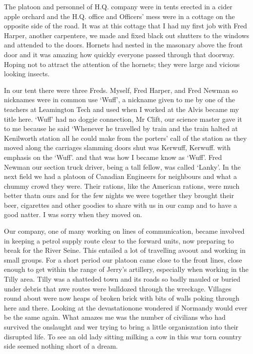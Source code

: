 The platoon and personnel of H.Q. company were in tents erected in a
cider apple orchard and the H.Q. office and Officers' mess were in a
cottage on the opposite side of the road. It was at this cottage that
I had my first job with Fred Harper, another carpentere, we made and
fixed black out shutters to the windows and attended to the
doors. Hornets had nested in the masonary above the front door and it
was amazing how quickly everyone passed through that doorway. Hoping
not to attract the attention of the hornets; they were large and
vicious looking insects.

In our tent there were three Freds. Myself, Fred Harper, and Fred
Newman so nicknames were in common use `Wuff', a nickname given to me
by one of the teachers at Leamington Tech and used when I worked at
the Alvis became my title here. `Wuff' had no doggie connection, Mr
Clift, our science master gave it to me because he said `Whenever he
travelled by train and the train halted at Kenilworth station all he
could make from the porters' call of the station as they moved along
the carriages slamming doors shut was Kerwuff, Kerwuff. with emphasis
on the `Wuff'. and that was how I became know as `Wuff'. Fred Newman
our section truck driver, being a tall fellow, was called `Lanky'. In
the next field we had a platoon of Canadian Engineers for neighbours
and what a chummy crowd they were. Their rations, like the American
rations, were much better thatn ours and for the few nights we were
together they brought their beer, cigarettes and other goodies to
share with us in our camp and to have a good natter. I was sorry when
they moved on.

Our company, one of many working on lines of communication, became
involved in keeping a petrol supply route clear to the forward units,
now preparing to break for the River Seine. This entailed a lot of
travelling avoout and working in small groups. For a short period our
platoon came close to the front lines, close enough to get within the
range of Jerry's artillery, especially when working in the Tilly
area. Tilly was a shatteded town and its roads so badly mauled or
buried under debris that nwe routes were bulldozed through the
wreckage. Villages round about were now heaps of broken brick with
bits of walls poking through here and there. Looking at the
devastationone wondered if Normandy would ever be the same again. What
amazes me was the number of civilians who had survived the onslaught
and wer trying to bring a little organiszation into their disrupted
life. To see an old lady sitting milking a cow in this war torn
country side seemed nothing short of a dream.


